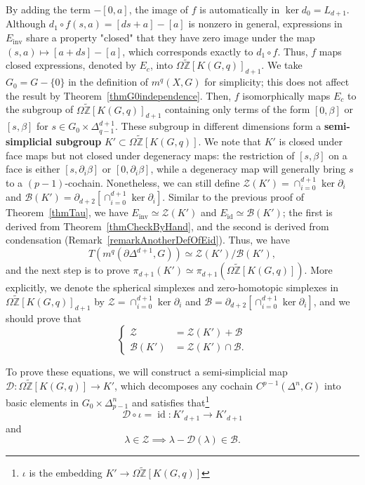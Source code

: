 \documentclass[reprint, amsmath, amssymb, showpacs, floatfix, longbibliography, aps, twocolumn, superscriptaddress, nofootinbib]{revtex4-2}
\newcommand{\tZ}{{\widetilde{\mathbb Z}}}
\newcommand{\id}{{\operatorname{id}}}
\newcommand{\inv}{{\operatorname{inv}}}
\theoremstyle{definition}
\begin{document}
By adding the term $-[0,a]$, the image of $f$ is automatically in $\ker d_0=L_{d+1}$. Although $d_1\circ f(s,a)=[ds+a]-[a]$ is nonzero in general, expressions in $E_\inv$ share a property "closed" that they have zero image under the map $(s,a)\mapsto [a+ds]-[a]$, which corresponds exactly to $d_1\circ f$. Thus, $f$ maps closed expressions, denoted by $E_c$, into $\Omega\tZ[K(G,q)]_{d+1}$. We take $G_0=G-\{0\}$ in the definition of $m^q(X,G)$ for simplicity; this does not affect the result by Theorem~\ref{thmG0independence}. Then, $f$ isomorphically maps $E_c$ to the subgroup of $\Omega\tZ[K(G,q)]_{d+1}$ containing only terms of the form $[0,\beta]$ or $[s,\beta]$ for $s\in G_0\times \Delta^{d+1}_{q-1}$. 
These subgroup in different dimensions form a \textbf{semi-simplicial subgroup} $K'\subset \Omega\tZ[K(G,q)]$. We note that $K'$ is closed under face maps but not closed under degeneracy maps: the restriction of $[s,\beta]$ on a face is either  $[s,\partial_i\beta]$ or $[0,\partial_i\beta]$, while a degeneracy map will generally bring $s$ to a $(p-1)$-cochain. Nonetheless, we can still define  $\mathcal{Z}(K')=\cap_{i=0}^{d+1}\ker \partial_i$ and $\mathcal{B}(K')=\partial_{d+2}[\cap_{i=0}^{d+1}\ker \partial_i]$. Similar to the previous proof of Theorem~\ref{thmTau}, we have $E_\inv\simeq \mathcal{Z}(K')$ and $E_\id\simeq \mathcal{B}(K')$; the first is derived from Theorem~\ref{thmCheckByHand}, and the second is derived from condensation (Remark~\ref{remarkAnotherDefOfEid}). Thus, we have
\begin{equation}
	T(m^q(\partial \Delta^{d+1},G))\simeq \mathcal{Z}(K')/\mathcal{B}(K'),
\end{equation} 
and the next step is to prove $\pi_{d+1}(K')\simeq \pi_{d+1}(\Omega\tZ[K(G,q)])$. More explicitly, we denote the spherical simplexes and zero-homotopic simplexes in $\Omega\tZ[K(G,q)]_{d+1}$ by $\mathcal{Z}=\cap_{i=0}^{d+1}\ker \partial_i$ and $\mathcal{B}=\partial_{d+2}[\cap_{i=0}^{d+1}\ker \partial_i]$, and we should prove that
\begin{equation}\label{eqB34}
	\left\{
	\begin{aligned}
		\mathcal{Z} &= \mathcal{Z}(K')+\mathcal{B}\\
		\mathcal{B}(K') &= \mathcal{Z}(K')\cap\mathcal{B}.
	\end{aligned}
	\right.
\end{equation}


To prove these equations, we will construct a semi-simplicial map $\mathcal{D}: \Omega\tZ[K(G,q)]\rightarrow K'$, which decomposes any cochain $C^{p-1}(\Delta^n,G)$ into basic elements in $G_0\times \Delta^n_{p-1}$ and satisfies that\footnote{$\iota$ is the embedding $K'\rightarrow \Omega\tZ[K(G,q)]$}
\begin{equation}
	\mathcal{D}\circ \iota=\id: K'_{d+1}\rightarrow K'_{d+1}
\end{equation}
and 
\begin{equation}
	\lambda\in\mathcal{Z}\implies\lambda-\mathcal{D}(\lambda)\in\mathcal{B}.
\end{equation}
\end{document}

